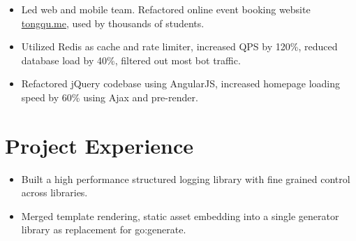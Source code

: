 \documentclass[11pt, letterpaper]{simple-cv}
\begin{document}

\begin{itemize}
	\item Led web and mobile team. Refactored online event booking website \href{https://tongqu.me}{tongqu.me}, used by thousands of students.
	\item Utilized Redis as cache and rate limiter, increased QPS by 120\%, reduced database load by 40\%, filtered out most bot traffic.
	\item Refactored jQuery codebase using AngularJS, increased homepage loading speed by 60\% using Ajax and pre-render.
\end{itemize}

\section{Project Experience}



\begin{itemize}
	\item Built a high performance structured logging library with fine grained control across libraries.
	\item Merged template rendering, static asset embedding into a single generator library as replacement for go:generate.
\end{itemize}
\end{document}
